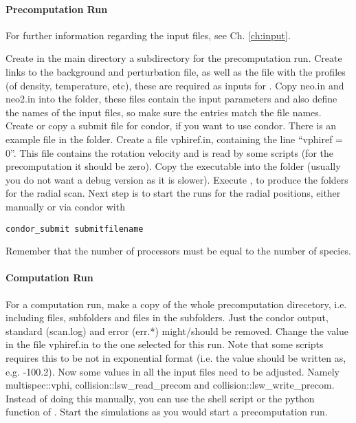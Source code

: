 \paragraph{Precomputation Run}
For further information regarding the input files, see Ch. \ref{ch:input}.

Create in the main directory a subdirectory for the precomputation run.
Create links to the background and perturbation file, as well as the
file with the profiles (of density, temperature, etc), these are required
as inputs for \neotwo.
Copy neo.in and neo2.in into the folder, these files contain the input
parameters and also define the names of the input files, so make sure
the entries match the file names. Create or copy a submit file
for condor, if you want to use condor. There is an example file in the
 folder. Create a file vphiref.in, containing the line
``vphiref = 0''. This file contains the rotation velocity and is read by
some scripts (for the precomputation it should be zero). Copy the
\neotwo executable into the folder (usually you do not want a debug
version as it is slower). Execute \neotwo, to produce the folders for
the radial scan. Next step is to start the runs for the radial
positions, either manually or via condor with
\begin{verbatim}
condor_submit submitfilename
\end{verbatim}

Remember that the number of processors must be equal to the number of
species.

\paragraph{Computation Run}
For a computation run, make a copy of the whole precomputation
direcetory, i.e. including files, subfolders and files in the
subfolders. Just the condor output, standard (scan.log) and error
(err.*) might/should be removed. Change the value in the file vphiref.in
to the one selected for this run. Note that some scripts requires this
to be not in exponential format (i.e. the value should be written as,
e.g. -100.2). Now some values in all the input files need to be adjusted.
Namely multispec::vphi, collision::lsw\_read\_precom and
collision::lsw\_write\_precom.
Instead of doing this manually, you can use the shell script
 or the python function  of
.
Start the simulations as you would start a precomputation run.

